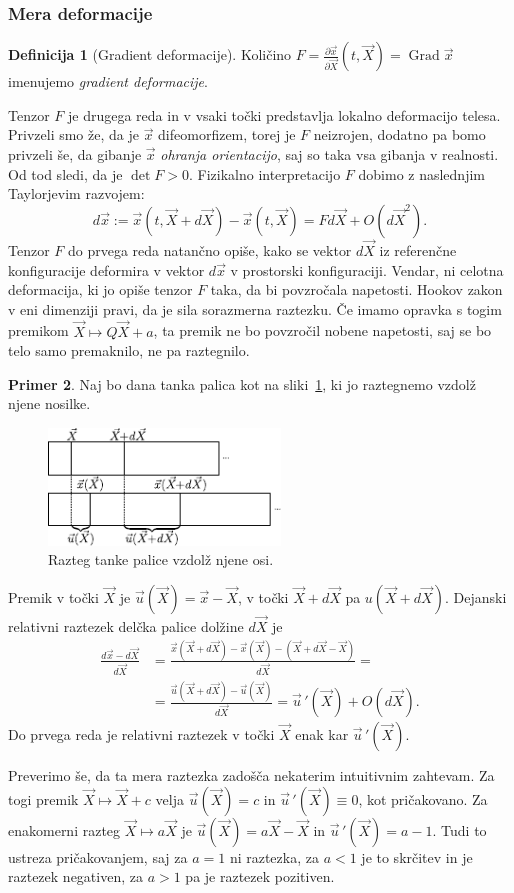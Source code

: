 \documentclass[12pt,a4paper,twoside]{article}
\theoremstyle{definition} %
\newtheorem{definicija}{Definicija}[section]
\newtheorem{primer}[definicija]{Primer}
\theoremstyle{plain} %
\numberwithin{equation}{section}
\newcommand{\Grad}{\operatorname{Grad}}
\newcommand{\dpar}[2]{\ensuremath{\frac{\partial #1}{\partial #2}}}
\newcommand{\vu}{\vec{u}}
\newcommand{\vX}{\vec{X}}
\newcommand{\vx}{\vec{x}}
\begin{document}
\subsubsection{Mera deformacije}
\begin{definicija}[Gradient deformacije]
  Količino $F = \dpar{\vx}{\vX}(t, \vX) = \Grad \vx$ imenujemo \emph{gradient
  deformacije}.
\end{definicija}

Tenzor $F$ je drugega reda in v vsaki točki predstavlja lokalno deformacijo
telesa. Privzeli smo že, da je $\vx$ difeomorfizem, torej je $F$ neizrojen,
dodatno pa bomo privzeli še, da gibanje $\vx$ \emph{ohranja orientacijo}, saj
so taka vsa gibanja v realnosti. Od tod sledi, da je $\det F > 0$.
Fizikalno interpretacijo $F$ dobimo z naslednjim Taylorjevim razvojem:
\begin{equation}
   d\vx := \vx(t, \vX+d\vX) - \vx(t, \vX) = F d\vX + O(d\vX^2).
\end{equation}
Tenzor $F$ do prvega reda natančno opiše, kako se vektor $d\vX$ iz referenčne
konfiguracije deformira v vektor $d\vx$ v prostorski konfiguraciji.
Vendar, ni celotna deformacija, ki jo opiše tenzor $F$ taka, da bi povzročala
napetosti. Hookov zakon v eni dimenziji pravi, da je sila sorazmerna raztezku.
Če imamo opravka s togim premikom $\vX \mapsto Q\vX + a$, ta premik ne bo povzročil
nobene napetosti, saj se bo telo samo premaknilo, ne pa raztegnilo.

\begin{primer}
Naj bo dana tanka palica kot na sliki~\ref{fig:palica}, ki jo raztegnemo vzdolž
njene nosilke.
\begin{figure}[h]
  \centering
  \includegraphics[width=0.55\textwidth]{images/stretch1d.pdf}
  \caption{Razteg tanke palice vzdolž njene osi.}
  \label{fig:palica}
\end{figure}
Premik v točki $\vX$ je $\vu(\vX) = \vx - \vX$, v točki $\vX+d\vX$ pa $u(\vX+d\vX)$.
Dejanski relativni raztezek delčka palice dolžine $d\vX$ je
\begin{align}
  \frac{d\vx - d\vX}{d\vX} &= \frac{\vx(\vX+d\vX) - \vx(\vX) - (\vX + d\vX - \vX)}{d\vX} = \nonumber \\ &=
  \frac{\vu(\vX + d\vX) - \vu(\vX)}{d\vX} = \vu\,'(\vX) + O(d\vX).
\end{align}
Do prvega reda je relativni raztezek v točki $\vX$ enak kar $\vu\,'(\vX)$.

Preverimo še, da ta mera raztezka zadošča nekaterim intuitivnim zahtevam. Za
togi premik $\vX \mapsto \vX + c$ velja $\vu(\vX) = c$ in $\vu\,'(\vX) \equiv 0$, kot
pričakovano.
Za enakomerni razteg $\vX \mapsto a\vX$ je $\vu(\vX) = a\vX - \vX$ in $\vu\,'(\vX) = a - 1$. Tudi
to ustreza pričakovanjem, saj za $a = 1$ ni raztezka, za $a< 1$ je to skrčitev
in je raztezek negativen, za $a>1$ pa je raztezek pozitiven.
\end{primer}
\end{document}
